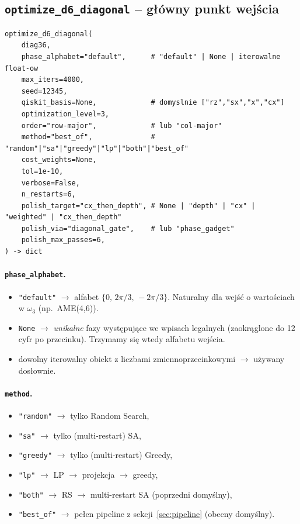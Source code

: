 \documentclass[11pt,a4paper]{article}
\newcommand{\1}{\mathbf{1}}
\newcommand{\w}{\omega}
\newcommand{\code}[1]{\texttt{#1}}
\begin{document}
\subsection{\texttt{optimize\_d6\_diagonal} -- główny punkt wejścia}
\label{sec:optimize-api}

\begin{lstlisting}
optimize_d6_diagonal(
    diag36,
    phase_alphabet="default",      # "default" | None | iterowalne float-ow
    max_iters=4000,
    seed=12345,
    qiskit_basis=None,             # domyslnie ["rz","sx","x","cx"]
    optimization_level=3,
    order="row-major",             # lub "col-major"
    method="best_of",              # "random"|"sa"|"greedy"|"lp"|"both"|"best_of"
    cost_weights=None,
    tol=1e-10,
    verbose=False,
    n_restarts=6,
    polish_target="cx_then_depth", # None | "depth" | "cx" | "weighted" | "cx_then_depth"
    polish_via="diagonal_gate",    # lub "phase_gadget"
    polish_max_passes=6,
) -> dict
\end{lstlisting}

\paragraph{\texttt{phase\_alphabet}.}
\begin{itemize}[leftmargin=*]
  \item \code{"default"} $\to$ alfabet $\{0,\,2\pi/3,\,-2\pi/3\}$.
        Naturalny dla wejść o wartościach w $\w_{3}$ (np.\ AME(4,6)).
  \item \code{None} $\to$ \emph{unikalne} fazy występujące we wpisach
        legalnych (zaokrąglone do 12 cyfr po przecinku). Trzymamy się
        wtedy alfabetu wejścia.
  \item dowolny iterowalny obiekt z liczbami zmiennoprzecinkowymi
        $\to$ używany dosłownie.
\end{itemize}

\paragraph{\texttt{method}.}
\begin{itemize}[leftmargin=*]
  \item \code{"random"} $\to$ tylko Random Search,
  \item \code{"sa"} $\to$ tylko (multi-restart) SA,
  \item \code{"greedy"} $\to$ tylko (multi-restart) Greedy,
  \item \code{"lp"} $\to$ LP $\to$ projekcja $\to$ greedy,
  \item \code{"both"} $\to$ RS $\to$ multi-restart SA (poprzedni
        domyślny),
  \item \code{"best\_of"} $\to$ pełen pipeline z sekcji~\ref{sec:pipeline}
        (obecny domyślny).
\end{itemize}
\end{document}
